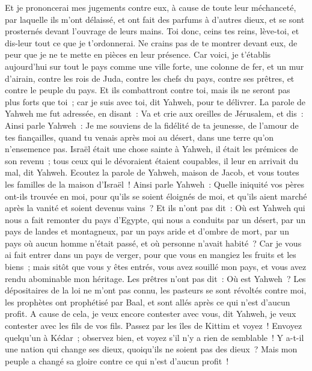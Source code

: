 \begin{multicols}{2}
Et je prononcerai mes jugements contre eux, à cause de toute leur méchanceté, par laquelle ils m'ont délaissé, et ont fait des parfums à d'autres dieux, et se sont prosternés devant l'ouvrage de leurs mains.
Toi donc, ceins tes reins, lève-toi, et dis-leur tout ce que je t'ordonnerai. Ne crains pas de te montrer devant eux, de peur que je ne te mette en pièces en leur présence.
Car voici, je t'établis aujourd'hui sur tout le pays comme une ville forte, une colonne de fer, et un mur d'airain, contre les rois de Juda, contre les chefs du pays, contre ses prêtres, et contre le peuple du pays.
Et ils combattront contre toi, mais ils ne seront pas plus forts que toi~; car je suis avec toi, dit Yahweh, pour te délivrer.
\VerseOne{}La parole de Yahweh me fut adressée, en disant~:
Va et crie aux oreilles de Jérusalem, et dis~: Ainsi parle Yahweh~: Je me souviens de la fidélité de ta jeunesse, de l'amour de tes fiançailles, quand tu venais après moi au désert, dans une terre qu'on n'ensemence pas.
Israël était une chose sainte à Yahweh, il était les prémices de son revenu~; tous ceux qui le dévoraient étaient coupables, il leur en arrivait du mal, dit Yahweh.
Ecoutez la parole de Yahweh, maison de Jacob, et vous toutes les familles de la maison d'Israël~!
Ainsi parle Yahweh~: Quelle iniquité vos pères ont-ils trouvée en moi, pour qu'ils se soient éloignés de moi, et qu'ils aient marché après la vanité et soient devenus vains~?
Et ils n'ont pas dit~: Où est Yahweh qui nous a fait remonter du pays d'Egypte, qui nous a conduits par un désert, par un pays de landes et montagneux, par un pays aride et d'ombre de mort, par un pays où aucun homme n'était passé, et où personne n'avait habité~?
Car je vous ai fait entrer dans un pays de verger, pour que vous en mangiez les fruits et les biens~; mais sitôt que vous y êtes entrés, vous avez souillé mon pays, et vous avez rendu abominable mon héritage.
Les prêtres n'ont pas dit~: Où est Yahweh~? Les dépositaires de la loi ne m'ont pas connu, les pasteurs se sont révoltés contre moi, les prophètes ont prophétisé par Baal, et sont allés après ce qui n'est d'aucun profit.
A cause de cela, je veux encore contester avec vous, dit Yahweh, je veux contester avec les fils de vos fils.
Passez par les îles de Kittim et voyez~! Envoyez quelqu'un à Kédar~; observez bien, et voyez s'il n'y a rien de semblable~!
Y a-t-il une nation qui change ses dieux, quoiqu'ils ne soient pas des dieux~? Mais mon peuple a changé sa gloire contre ce qui n'est d'aucun profit~!

\end{multicols}
